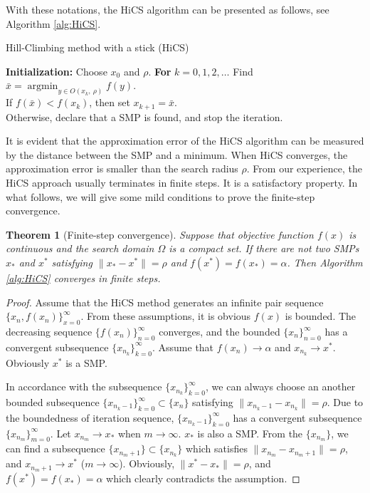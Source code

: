 \documentclass[final,1p,times]{elsarticle}
\newtheorem{theorem}{Theorem}
\DeclareMathOperator*{\argmin}{\mathrm{argmin}}
\begin{document}
With these notations, the HiCS algorithm can be presented
as follows, see Algorithm \ref{alg:HiCS}.
\begin{algorithm}[H]
	\caption{Hill-Climbing method with a stick (HiCS)}
	\label{alg:HiCS}
\begin{algorithmic}[1]
	\STATE \textbf{Initialization:} Choose $x_0$ and $\rho$.
	\STATE \textbf{For} $k=0,1,2,\dots$
	\STATE \hspace{0.5cm} 
	Find $\bar{x}=\argmin_{y\in O(x_k,~ \rho)} f(y)$.
			\\
	\hspace{0.5cm} If $f(\bar x)<f(x_k)$, then set $x_{k+1}= \bar{x}$.
		  \\
		   \hspace{0.5cm} Otherwise, declare that 
		   a SMP is found, and stop the iteration.
\end{algorithmic}
\end{algorithm}
It is evident that the approximation error of the HiCS algorithm
can be measured by the distance between the SMP and a minimum.
When HiCS converges, the approximation error is smaller than the search radius
$\rho$.
From our experience, the HiCS approach usually terminates in 
finite steps. It is a satisfactory property. In what follows, we will
give some mild conditions to prove the finite-step convergence.

\begin{theorem}[Finite-step convergence]
	\label{thm:fsc}
	Suppose that objective function $f(x)$ is continuous and the
	search domain $\Omega$ is a compact set.
	If there are not two SMPs $x_*$ and $x^*$ satisfying 
	$\|x_*-x^*\|=\rho$ and $f(x^*)=f(x_*)=\alpha$.
	Then Algorithm \ref{alg:HiCS} converges in finite steps.
\end{theorem}
\begin{proof}
	Assume that the HiCS method generates an infinite pair sequence
	$\{x_n, f(x_n)\}_{x=0}^{\infty}$. From these assumptions,
	it is obvious $f(x)$ is bounded. The decreasing sequence
	$\{f(x_n)\}_{n=0}^\infty$ converges, and the bounded
	$\{x_n\}_{n=0}^\infty$ has a convergent subsequence 
	$\{x_{n_k}\}_{k=0}^\infty$. Assume that $f(x_n)\rightarrow
	\alpha$ and $x_{n_k}\rightarrow x^*$. Obviously $x^*$ is a SMP.
	
	In accordance with the subsequence
	$\{x_{n_k}\}_{k=0}^\infty$, we can always choose an another
	bounded subsequence $\{x_{n_k -1}\}_{k=0}^\infty \subset
	\{x_n\}$ satisfying $\|x_{n_k - 1}-x_{n_k}\|=\rho$. 
	Due to the boundedness of iteration
	sequence, $\{x_{n_k-1}\}_{k=0}^\infty$ has a convergent
	subsequence $\{x_{n_{m}}\}_{m=0}^\infty$. Let $x_{n_m}
	\rightarrow x_*$ when $m\rightarrow \infty$. $x_*$ is also a SMP.
	From the $\{x_{n_m}\}$, we can find a subsequence
	$\{x_{n_{m}+1}\}\subset \{x_{n_k}\}$ which satisfies
	$\|x_{n_m}-x_{n_{m}+1}\|=\rho$, and $x_{n_{m}+1}\rightarrow x^*$
	($m\rightarrow \infty$).
	Obviously, $\|x^*-x_*\|=\rho$, and $f(x^*)=f(x_*)=\alpha$ 
	which clearly contradicts the assumption.
\end{proof}
\end{document}
